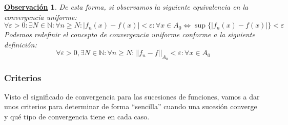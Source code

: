 \documentclass[10pt,a4paper,openright]{book}
\theoremstyle{break}
\newtheorem{obs}{\underline{Observación}}[chapter]
\begin{document}
\begin{obs}
De esta forma, si observamos la siguiente equivalencia en la convergencia uniforme:
$$\forall \varepsilon> 0: \exists N\in \mathbb N: \forall n\geq N : |f_n(x)-f(x)|<\varepsilon : \forall x \in A_0 \Leftrightarrow \sup \{|f_n(x)-f(x)|\}<\varepsilon$$
Podemos redefinir el concepto de convergencia uniforme conforme a la siguiente definición:
$$\forall \varepsilon > 0, \exists N \in \mathbb{N} : \forall n \geq N : ||f_n - f|| _{A_0}< \varepsilon : \forall x \in A_0 $$
\end{obs}

\subsubsection{Criterios}
Visto el significado de convergencia para las sucesiones de funciones, vamos a dar unos criterios para determinar de forma ``sencilla'' cuando una sucesión converge y qué tipo de convergencia tiene en cada caso.
\end{document}
